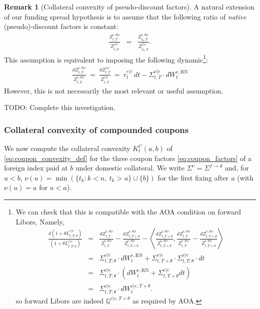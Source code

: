 \documentclass[11pt,english]{amsart}
\newcommand{\RN}{\mathrm{RN}}
\newcommand{\QQ}{\mathbb{Q}}
\theoremstyle{definition}
\newtheorem{rema}{Remark}
\begin{document}
\begin{rema}[Collateral convexity of pseudo-discount factors]
A natural extension of our funding spread hypothesis is to assume that the following ratio of \emph{native} (pseudo)-discount factors is constant:
\begin{eqnarray}
  \frac{ Z^{e,\theta|e}_{t,T}   }{ Z^{e|e}_{t,S}  }   &=& \frac{ Z^{e,\theta|e}_{t_0,T}   }{ Z^{e|e}_{t_0,S}  }  .
\end{eqnarray} 
This assumption is equivalent to imposing the following dynamic\footnote{
We can check that this is compatible with the AOA condition on forward Libors, Namely, 
\begin{eqnarray}
  \frac{ d (1+\theta L^{e|e}_{t,T;\theta})   }{ (1+\theta L^{e|e}_{t,T;\theta}) }   &=&  \frac{ dZ^{e,\theta|e}_{t,T}   }{ Z^{e,\theta|e}_{t,T} }  - \frac{ dZ^{e,\theta|e}_{t,T+\theta}   }{ Z^{e,\theta|e}_{t,T+\theta} } - \left\langle \frac{ dZ^{e,\theta|e}_{t,T+\theta}   }{ Z^{e,\theta|e}_{t,T+\theta} } ,   \frac{ dZ^{e,\theta|e}_{t,T}   }{ Z^{e,\theta|e}_{t,T} }  - \frac{ dZ^{e,\theta|e}_{t,T+\theta}   }{ Z^{e,\theta|e}_{t,T+\theta} }  \right\rangle \\
  &=& \Sigma^{e|e}_{t,T;\theta} \cdot dW^{e,\RN}_t +  \Sigma^{e|e}_{t,T+\theta} \cdot  \Sigma^{e|e}_{t,T;\theta} \cdot dt \\
  &=& \Sigma^{e|e}_{t,T;\theta} \cdot \left( dW^{e,\RN}_t +  \Sigma^{e|e}_{t,T+\theta} dt  \right) \\
  &=& \Sigma^{e|e}_{t,T;\theta} \cdot dW^{e|e,T+\theta}_t  .
\end{eqnarray}
so forward Libors are indeed $\QQ^{e|e,T+\theta}$ as required by AOA.  
}:
\begin{eqnarray}
  \frac{ dZ^{e,\theta|e}_{t,T}   }{ Z^{e,\theta|e}_{t,T} }   ~=~  \frac{ dZ^{e|e}_{t,T}   }{ Z^{e|e}_{t,T} } ~=~ r^{e|e}_t \, dt - \Sigma^{e|e}_{t,T} \cdot dW^{e,\RN}_t 
\end{eqnarray}
However, this is not necessarily the most relevant or useful assumption.

TODO: Complete this investigation.
\end{rema}



\subsubsection{Collateral convexity of compounded coupons}%

We now compute the collateral convexity $K^C_t(a,b)$ of \eqref{eq:coupon_convexity_def} for the three coupon factors \eqref{eq:coupon_factors} of a foreign index paid at $b$ under domestic collateral. We write $\Sigma^c = \Sigma^{f\to d}$ and, for $u<b$, $\nu(u) = \min\left(\{t_k : k<n,\ t_k>u\}\cup\{b\}\right)$ for the first fixing after $u$ (with $\nu(u) = a$ for $u<a$).
\end{document}
